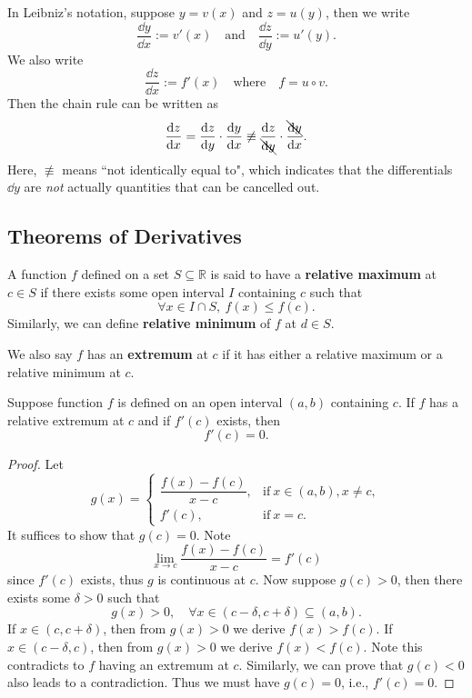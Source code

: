 \documentclass[a4paper]{ctexart}
\begin{document}
	\begin{myrmk}
		In Leibniz's notation, suppose $y=v(x)$ and $z=u(y)$, then we write
		\[
		\frac{\dd y}{\dd x}:=v'(x)
		\quad \text{and}\quad
		\frac{\dd z}{\dd y}:=u'(y).
		\]
		We also write
		\[
		\frac{\dd z}{\dd x} := f'(x)
		\quad \text{where}\quad f=u \circ v.
		\]
		Then the chain rule can be written as
		\[
		\frac{\dd z}{\dd x} = \frac{\dd z}{\dd y} \cdot \frac{\dd y}{\dd x} \not\equiv \frac{\dd z}{\bcancel{\dd y}}\cdot \frac{\bcancel{\dd y}}{\dd x}.
		\]
		Here, $\not \equiv$ means ``not identically equal to", which indicates that the differentials $\dd y$ are \emph{not} actually quantities that can be cancelled out.
	\end{myrmk}

	\subsection{Theorems of Derivatives}
	\begin{mydef}
		A function $f$ defined on a set $S \subseteq \mathbb{R}$ is said to have a \textbf{relative maximum} at $c\in S$ if there exists some open interval $I$ containing $c$ such that
		\[
		\forall x \in I \cap S,\ f(x) \le f(c).
		\]
		Similarly, we can define \textbf{relative minimum} of $f$ at $d\in S$.
	\end{mydef}
	\begin{myrmk}
		We also say $f$ has an \textbf{extremum} at $c$ if it has either a relative maximum or a relative minimum at $c$.
	\end{myrmk}
	\begin{mythm}
		Suppose function $f$ is defined on an open interval $(a,b)$ containing $c$. If $f$ has a relative extremum at $c$ and if $f'(c)$ exists, then
		\[
		f'(c)=0.
		\]
	\end{mythm}
	\begin{proof}
		Let
		\[
		g(x)=\begin{cases}
		\dfrac{f(x)-f(c)}{x-c}, & \text{if}\ x \in (a,b), x\neq c,\\[6pt]
		f'(c), & \text{if}\ x=c.
		\end{cases}
		\]
		It suffices to show that $g(c)=0$. Note
		\[
		\lim_{x \to c} \frac{f(x)-f(c)}{x-c}=f'(c)
		\]
		since $f'(c)$ exists, thus $g$ is continuous at $c$. Now suppose $g(c)>0$, then there exists some $\delta>0$ such that
		\[
		g(x)>0,\quad \forall x\in (c-\delta, c+\delta) \subseteq (a,b).
		\]
		If $x\in(c, c+\delta)$, then from $g(x)>0$ we derive $f(x)>f(c)$. If $x\in(c-\delta, c)$, then from $g(x)>0$ we derive $f(x)<f(c)$. Note this contradicts to $f$ having an extremum at $c$. Similarly, we can prove that $g(c)<0$ also leads to a contradiction. Thus we must have $g(c)=0$, i.e., $f'(c)=0$.
	\end{proof}
\end{document}
